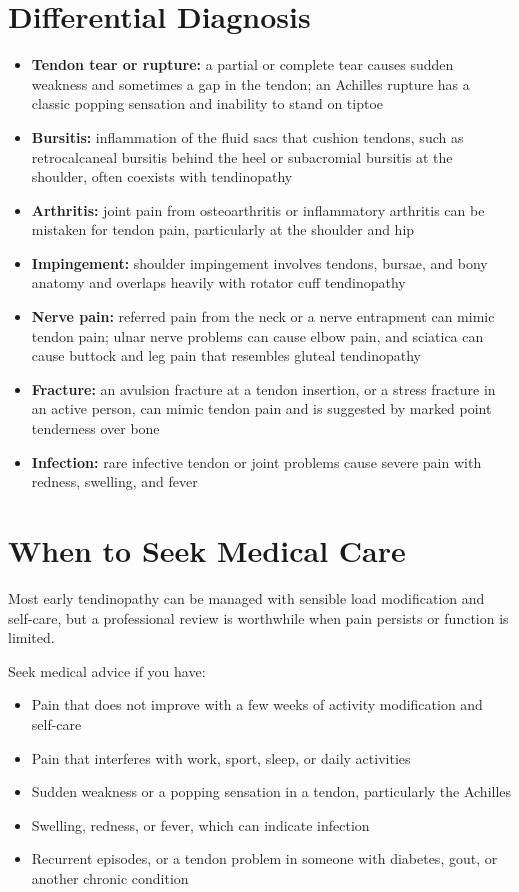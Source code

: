 \section*{Differential Diagnosis}
\begin{itemize}
    \item \textbf{Tendon tear or rupture:} a partial or complete tear causes sudden weakness and sometimes a gap in the tendon; an Achilles rupture has a classic popping sensation and inability to stand on tiptoe
    \item \textbf{Bursitis:} inflammation of the fluid sacs that cushion tendons, such as retrocalcaneal bursitis behind the heel or subacromial bursitis at the shoulder, often coexists with tendinopathy
    \item \textbf{Arthritis:} joint pain from osteoarthritis or inflammatory arthritis can be mistaken for tendon pain, particularly at the shoulder and hip
    \item \textbf{Impingement:} shoulder impingement involves tendons, bursae, and bony anatomy and overlaps heavily with rotator cuff tendinopathy
    \item \textbf{Nerve pain:} referred pain from the neck or a nerve entrapment can mimic tendon pain; ulnar nerve problems can cause elbow pain, and sciatica can cause buttock and leg pain that resembles gluteal tendinopathy
    \item \textbf{Fracture:} an avulsion fracture at a tendon insertion, or a stress fracture in an active person, can mimic tendon pain and is suggested by marked point tenderness over bone
    \item \textbf{Infection:} rare infective tendon or joint problems cause severe pain with redness, swelling, and fever
\end{itemize}

\section*{When to Seek Medical Care}
Most early tendinopathy can be managed with sensible load modification and self-care, but a professional review is worthwhile when pain persists or function is limited.

Seek medical advice if you have:
\begin{itemize}
    \item Pain that does not improve with a few weeks of activity modification and self-care
    \item Pain that interferes with work, sport, sleep, or daily activities
    \item Sudden weakness or a popping sensation in a tendon, particularly the Achilles
    \item Swelling, redness, or fever, which can indicate infection
    \item Recurrent episodes, or a tendon problem in someone with diabetes, gout, or another chronic condition
\end{itemize}

